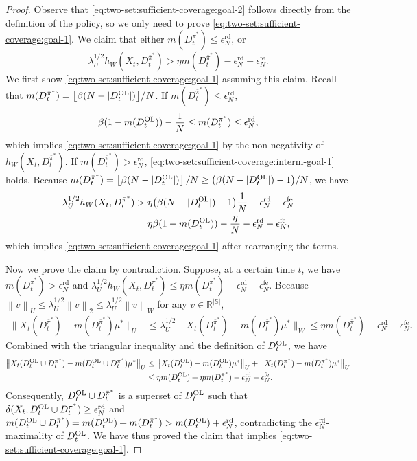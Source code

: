 \documentclass[11pt,letterpaper]{article}
\theoremstyle{plain}
\theoremstyle{definition}
\theoremstyle{remark}
\newcommand{\norm}[1]{\left\lVert#1\right\rVert}
\newcommand{\normbig}[1]{\big\lVert#1\big\rVert}
\newcommand{\R}{\mathbb{R}}
\newcommand{\floor}[1]{\left\lfloor#1\right\rfloor}
\newcommand{\sspa}{\mathbb{S}}
\newcommand{\pibar}{{\sysbar{\pi}}}
\newcommand{\pibs}{{\pibar^*}}
\newcommand{\sysbar}[1]{\bar{#1}}
\newcommand{\statdist}{\mu^*}
\newcommand{\wmat}{W}
\newcommand{\umat}{U}
\newcommand{\errfe}{\epsilon_N^{\text{fe}}}
\newcommand{\errtol}{\epsilon_N^{\text{rd}}}
\newcommand{\hw}{h_\wmat}
\newcommand{\lamu}{\lambda_\umat}
\newcommand{\Da}{D^{\pibs}}
\newcommand{\Db}{D^{\textup{OL}}}
\newcommand{\slkb}{\delta}
\begin{document}
\sufficientcoverage*

\begin{proof}%
    Observe that \eqref{eq:two-set:sufficient-coverage:goal-2} follows directly from the definition of the policy, so we only need to prove \eqref{eq:two-set:sufficient-coverage:goal-1}. 
    We claim that either $m(\Da_t) \leq \errtol$, or 
    \begin{equation}
        \label{eq:two-set:sufficient-coverage:interm-goal-1}
        \lamu^{1/2} \hw(X_t, \Da_t) >  \eta m(\Da_t) - \errtol - \errfe. 
    \end{equation}
    We first show \eqref{eq:two-set:sufficient-coverage:goal-1} assuming this claim. 
    Recall that $m(\Da_{t})= \big\lfloor \beta (N -|\Db_{t}|)\big\rfloor \big/ N$. If $m(\Da_t) \leq \errtol$, 
    \[
        \beta(1-m(\Db_t)) - \frac{1}{N} \leq m(\Da_t) \leq \errtol,
    \]
    which implies \eqref{eq:two-set:sufficient-coverage:goal-1} by the non-negativity of $\hw(X_t, \Da_t)$. 
    If $m(\Da_t) > \errtol$, \eqref{eq:two-set:sufficient-coverage:interm-goal-1} holds. Because $m(\Da_t) = \floor{\beta (N - |\Db_t|)} /N \geq \big(\beta (N - |\Db_t|) - 1\big) / N$, we have
    \begin{align*}
        \lamu^{1/2} \hw(X_t, \Da_t) &>  \eta \big(\beta(N -|\Db_{t}|)-1\big)\frac{1}{N} -  \errtol - \errfe \\
        &=  \eta \beta(1-m(\Db_t)) -  \frac{\eta}{N} - \errtol - \errfe,
    \end{align*}
    which implies \eqref{eq:two-set:sufficient-coverage:goal-1} after rearranging the terms. 

    Now we prove the claim by contradiction. Suppose, at a certain time $t$, we have $m(\Da_t) > \errtol$ and $ \lamu^{1/2}\hw(X_t, \Da_t) \leq \eta m(\Da_t) - \errtol - \errfe$. Because $\norm{v}_\umat \leq \lamu^{1/2}\norm{v}_2 \leq \lamu^{1/2}\norm{v}_\wmat$ for any $v\in \R^{|\sspa|}$, 
    \begin{align}
        \nonumber
        \normbig{X_t(\Da_t) - m(\Da_t) \statdist}_\umat 
        &\leq \lamu^{1/2}\normbig{X_t(\Da_t) - m(\Da_t) \statdist}_\wmat
        \leq  \eta m(\Da_t) - \errtol - \errfe. 
    \end{align}
    Combined with the triangular inequality and the definition of $\Db_t$, we have
    \begin{align*}
        \normbig{X_t(\Db_t\cup\Da_t) - m(\Db_t\cup\Da_t) \statdist}_\umat &\leq \normbig{X_t(\Db_t) - m(\Db_t) \statdist}_\umat  + \normbig{X_t(\Da_t) - m(\Da_t) \statdist}_\umat \\
        &\leq \eta m(\Db_t) + \eta m(\Da_t) - \errtol - \errfe.
    \end{align*}
    Consequently, $\Db_t\cup\Da_t$ is a superset of $\Db_t$ such that $\slkb(X_t, \Db_t\cup\Da_t) \geq \errtol$ and $m(\Db_t \cup \Da_t) = m(\Db_t) + m(\Da_t) > m(\Db_t) + \errtol$, contradicting the $\errtol$-maximality of $\Db_t$. 
    We have thus proved the claim that implies  \eqref{eq:two-set:sufficient-coverage:goal-1}. 
\end{proof}
\end{document}
